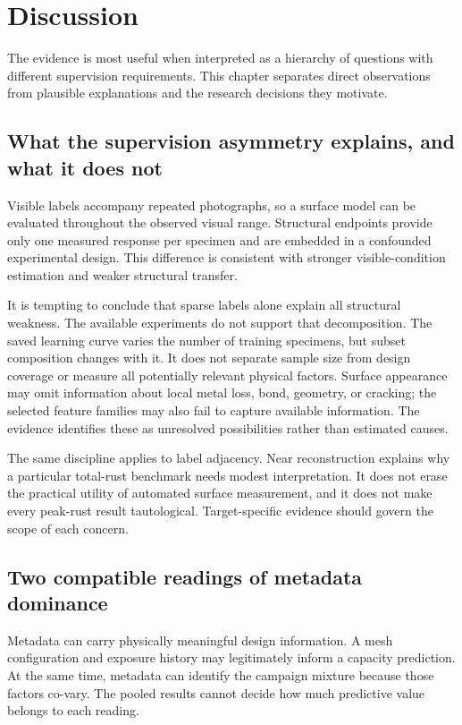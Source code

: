 \chapter{Discussion}\label{ch:discussion}
The evidence is most useful when interpreted as a hierarchy of questions with different supervision requirements. This chapter separates direct observations from plausible explanations and the research decisions they motivate.

\section{What the supervision asymmetry explains, and what it does not}
Visible labels accompany repeated photographs, so a surface model can be evaluated throughout the observed visual range. Structural endpoints provide only one measured response per specimen and are embedded in a confounded experimental design. This difference is consistent with stronger visible-condition estimation and weaker structural transfer.

It is tempting to conclude that sparse labels alone explain all structural weakness. The available experiments do not support that decomposition. The saved learning curve varies the number of training specimens, but subset composition changes with it. It does not separate sample size from design coverage or measure all potentially relevant physical factors. Surface appearance may omit information about local metal loss, bond, geometry, or cracking; the selected feature families may also fail to capture available information. The evidence identifies these as unresolved possibilities rather than estimated causes.

The same discipline applies to label adjacency. Near reconstruction explains why a particular total-rust benchmark needs modest interpretation. It does not erase the practical utility of automated surface measurement, and it does not make every peak-rust result tautological. Target-specific evidence should govern the scope of each concern.

\section{Two compatible readings of metadata dominance}
Metadata can carry physically meaningful design information. A mesh configuration and exposure history may legitimately inform a capacity prediction. At the same time, metadata can identify the campaign mixture because those factors co-vary. The pooled results cannot decide how much predictive value belongs to each reading.

